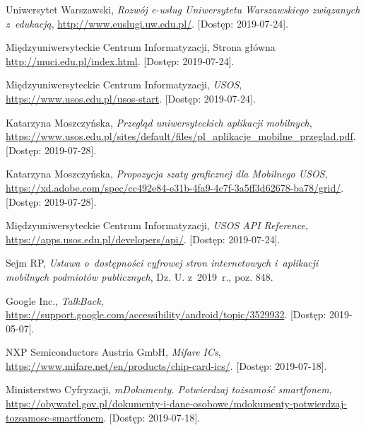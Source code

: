 \documentclass{pracamgr}
\begin{document}
\cleardoublepage
{}
{}
\listoftables


\begin{thebibliography}{99}


 Uniwersytet Warszawski,
\textit{Rozwój e-usług Uniwersytetu Warszawskiego związanych z~edukacją},
\url{http://www.euslugi.uw.edu.pl/}. [Dostęp: 2019-07-24].

 Międzyuniwersyteckie Centrum Informatyzacji, Strona główna
\url{http://muci.edu.pl/index.html}. [Dostęp: 2019-07-24].

 Międzyuniwersyteckie Centrum Informatyzacji, \textit{USOS},
\url{https://www.usos.edu.pl/usos-start}. [Dostęp: 2019-07-24].

  Katarzyna Moszczyńska, \textit{Przegląd uniwersyteckich aplikacji mobilnych},
\url{https://www.usos.edu.pl/sites/default/files/pl_aplikacje_mobilne_przeglad.pdf}. [Dostęp: 2019-07-28].

  Katarzyna Moszczyńska, \textit{Propozycja szaty graficznej dla Mobilnego USOS},
\url{https://xd.adobe.com/spec/cc492e84-e31b-4fa9-4c7f-3a5ff3d62678-ba78/grid/}. [Dostęp: 2019-07-28].

 Międzyuniwersyteckie Centrum Informatyzacji, \textit{USOS API Reference},
\url{https://apps.usos.edu.pl/developers/api/}. [Dostęp: 2019-07-24].

 Sejm RP, \textit{Ustawa o~dostępności cyfrowej stron internetowych i~aplikacji mobilnych podmiotów publicznych}, Dz. U. z~2019~r., poz. 848.

 Google Inc., \textit{TalkBack}, \url{https://support.google.com/accessibility/android/topic/3529932}. [Dostęp: 2019-05-07].

 NXP Semiconductors Austria GmbH, \textit{Mifare ICs}, \url{https://www.mifare.net/en/products/chip-card-ics/}. [Dostęp: 2019-07-18].

 Ministerstwo Cyfryzacji, \textit{mDokumenty. Potwierdzaj tożsamość smartfonem},\\ \url{https://obywatel.gov.pl/dokumenty-i-dane-osobowe/mdokumenty-potwierdzaj-tozsamosc-smartfonem}. [Dostęp: 2019-07-18].


\end{thebibliography}
\end{document}
